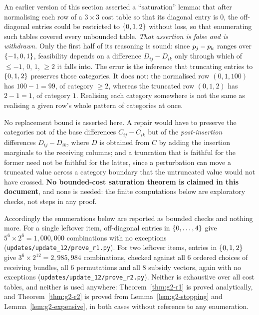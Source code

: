 \begin{remark}
\label{rem:g2-saturation-withdrawn}
An earlier version of this section asserted a ``saturation'' lemma: that
after normalising each row of a $3\times3$ cost table so that its diagonal
entry is $0$, the off-diagonal entries could be restricted to
$\left\{0,1,2\right\}$ without loss, so that enumerating such tables covered every
unbounded table. \emph{That assertion is false and is withdrawn.} Only the
first half of its reasoning is sound: since $p_j - p_k$ ranges
over $\left\{-1,0,1\right\}$, feasibility depends on a difference $D_{ij}-D_{ik}$
only through which of $\le-1$, $0$, $1$, $\ge2$ it falls into. The error is
the inference that truncating entries to $\left\{0,1,2\right\}$ preserves those
categories. It does not: the normalised row $(0,1,100)$ has
$100 - 1 = 99$, of category $\ge 2$, whereas the truncated row $(0,1,2)$ has
$2-1 = 1$, of category $1$. Realising each category somewhere is not the
same as realising a given row's whole pattern of categories at once.

No replacement bound is asserted here. A repair would have to preserve the
categories not of the base differences $C_{ij}-C_{ik}$ but of the
\emph{post-insertion} differences $D_{ij}-D_{ik}$, where $D$ is obtained from
$C$ by adding the insertion marginals to the receiving columns; and a
truncation that is faithful for the former need not be faithful for the
latter, since a perturbation can move a truncated value across a category
boundary that the untruncated value would not have crossed. \textbf{No
bounded-cost saturation theorem is claimed in this document}, and none is
needed: the finite computations below are exploratory checks, not steps in
any proof.
\end{remark}

Accordingly the enumerations below are reported as bounded checks and nothing
more. For a single leftover item, off-diagonal entries in $\left\{0,\dots,4\right\}$
give $5^6 \times 2^6 = 1{,}000{,}000$ combinations with no exceptions
(\texttt{updates/update\_12/prove\_r1.py}). For two leftover items, entries in
$\left\{0,1,2\right\}$ give $3^6 \times 2^{12} = 2{,}985{,}984$ combinations, checked
against all $6$ ordered choices of receiving bundles, all $6$ permutations
and all $8$ subsidy vectors, again with no exceptions
(\texttt{updates/update\_12/prove\_r2.py}). Neither is exhaustive over all cost
tables, and neither is used anywhere: Theorem~\ref{thm:g2-r1} is proved
analytically, and Theorem~\ref{thm:g2-r2} is proved from
Lemma~\ref{lem:g2-stopping} and Lemma~\ref{lem:g2-expensive}, in both cases
without reference to any enumeration.

